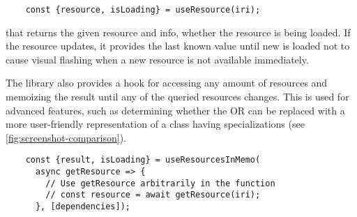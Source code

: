 \begin{verbatim}
    const {resource, isLoading} = useResource(iri);
\end{verbatim}

\noindent that returns the given resource and info, whether the resource is being loaded. If the resource updates, it provides the last known value until new is loaded not to cause visual flashing when a new resource is not available immediately.

The library also provides a hook for accessing any amount of resources and memoizing the result until any of the queried resources changes. This is used for advanced features, such as determining whether the OR can be replaced with a more user-friendly representation of a class having specializations (see \autoref{fig:screenshot-comparison}).

\begin{verbatim}
    const {result, isLoading} = useResourcesInMemo(
      async getResource => {
        // Use getResource arbitrarily in the function
        // const resource = await getResource(iri);
      }, [dependencies]);
\end{verbatim}